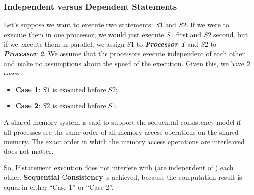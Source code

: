 \subsubsection{Independent versus Dependent Statements}
\par Let's suppose we want to execute two statements: $S1$ and $S2$. If we were to execute them in one processor, we would just execute $S1$ first and $S2$ second, but if we execute them in parallel, we assign $S1$ to \textbf{\textit{Processor 1}} and $S2$ to \textbf{\textit{Processor 2}}. We assume that the processors execute independent of each other and make no assumptions about the speed of the execution. Given this, we have 2 cases:
\begin{itemize}
    \item \textbf{Case 1}: $S1$ is executed before $S2$;
    \item \textbf{Case 2}: $S2$ is executed before $S1$.
\end{itemize}
\par A shared memory system is said to support the sequential consistency model if all processes see the same order of all memory access operations on the shared memory. The exact order in which the memory access operations are interleaved does not matter.
\par So, If statement execution does not interfere with (are independent of ) each other, \textbf{Sequential Consistency} is achieved, because the computation result is equal in either \enquote{Case 1} or \enquote{Case 2}.
%
\clearpage
%
